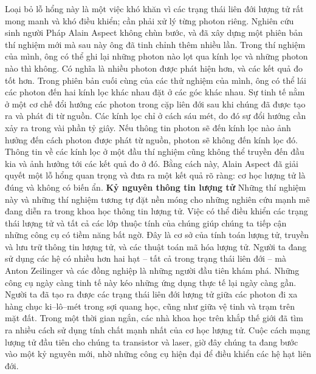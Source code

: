 \begin{multicols}{2}
	\vskip 0.1cm
	Loại bỏ lỗ hổng này là một việc khó khăn vì các trạng thái liên đới lượng tử rất mong manh và khó điều khiển; cần phải xử lý từng photon riêng. Nghiên cứu sinh người Pháp Alain Aspect không chùn bước, và đã xây dựng một phiên bản thí nghiệm mới mà sau này ông đã tinh chỉnh thêm nhiều lần. Trong thí nghiệm của mình, ông có thể ghi lại những photon nào lọt qua kính lọc và những photon nào thì không. Có nghĩa là nhiều photon được phát hiện hơn, và các kết quả đo tốt hơn.
	\vskip 0.1cm
	Trong phiên bản cuối cùng của các thử nghiệm của mình, ông có thể lái các photon đến hai kính lọc khác nhau đặt ở các góc khác nhau. Sự tinh tế nằm ở một cơ chế đổi hướng các photon trong cặp liên đới sau khi chúng đã được tạo ra và phát đi từ nguồn. Các kính lọc chỉ ở cách sáu mét, do đó sự đổi hướng cần xảy ra trong vài phần tỷ giây. Nếu thông tin photon sẽ đến kính lọc nào ảnh hưởng đến cách photon được phát từ nguồn, photon sẽ không đến kính lọc đó. Thông tin về các kính lọc ở một đầu thí nghiệm cũng không thể truyền đến đầu kia và ảnh hưởng tới các kết quả đo ở đó.
	\vskip 0.1cm
	Bằng cách này, Alain Aspect đã giải quyết một lỗ hổng quan trọng và đưa ra một kết quả rõ ràng: cơ học lượng tử là đúng và không có biến ẩn.
	\vskip 0.1cm
	\textbf{\color{timhieukhoahoc}Kỷ nguyên thông tin lượng tử}
	\vskip 0.1cm
	Những thí nghiệm này và những thí nghiệm tương tự đặt nền móng cho những nghiên cứu mạnh mẽ đang diễn ra trong khoa học thông tin lượng tử.
	\vskip 0.1cm
	Việc có thể điều khiển các trạng thái lượng tử và tất cả các lớp thuộc tính của chúng giúp chúng ta tiếp cận những công cụ có tiềm năng bất ngờ. Đây là cơ sở của tính toán lượng tử, truyền và lưu trữ thông tin lượng tử, và các thuật toán mã hóa lượng tử. Người ta đang sử dụng các hệ có nhiều hơn hai hạt -- tất cả trong trạng thái liên đới -- mà Anton Zeilinger và các đồng nghiệp là những người đầu tiên khám phá.
	\vskip 0.1cm
	Những công cụ ngày càng tinh tế này kéo những ứng dụng thực tế lại ngày càng gần. Người ta đã tạo ra được các trạng thái liên đới lượng tử giữa các photon đi xa hàng chục ki--lô--mét trong sợi quang học, cũng như giữa vệ tinh và trạm trên mặt đất. Trong một thời gian ngắn, các nhà khoa học trên khắp thế giới đã tìm ra nhiều cách sử dụng tính chất mạnh nhất của cơ học lượng tử.
	\vskip 0.1cm
	Cuộc cách mạng lượng tử đầu tiên cho chúng ta transistor và laser, giờ đây chúng ta đang bước vào một kỷ nguyên mới, nhờ những công cụ hiện đại để điều khiển các hệ hạt liên đới.
\end{multicols}